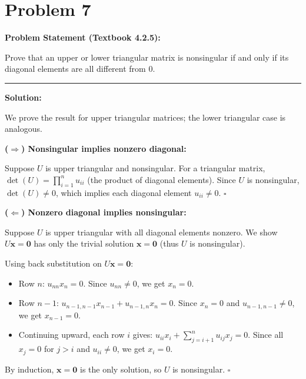 \clearpage
\section*{Problem 7}

\textbf{Problem Statement (Textbook 4.2.5):} 

Prove that an upper or lower triangular matrix is nonsingular if and only if its diagonal elements are all different from $0$.

\noindent\rule{\textwidth}{0.4pt}

\vspace{1em}

\textbf{Solution:}

We prove the result for upper triangular matrices; the lower triangular case is analogous.

\textbf{($\Rightarrow$) Nonsingular implies nonzero diagonal:}

Suppose $U$ is upper triangular and nonsingular. For a triangular matrix, $\det(U) = \prod_{i=1}^{n} u_{ii}$ (the product of diagonal elements). Since $U$ is nonsingular, $\det(U) \neq 0$, which implies each diagonal element $u_{ii} \neq 0$. $\square$

\vspace{1.5em}

\textbf{($\Leftarrow$) Nonzero diagonal implies nonsingular:}

Suppose $U$ is upper triangular with all diagonal elements nonzero. We show $U\mathbf{x} = \mathbf{0}$ has only the trivial solution $\mathbf{x} = \mathbf{0}$ (thus $U$ is nonsingular).

Using back substitution on $U\mathbf{x} = \mathbf{0}$:
\begin{itemize}
    \item Row $n$: $u_{nn}x_n = 0$. Since $u_{nn} \neq 0$, we get $x_n = 0$.
    \item Row $n-1$: $u_{n-1,n-1}x_{n-1} + u_{n-1,n}x_n = 0$. Since $x_n = 0$ and $u_{n-1,n-1} \neq 0$, we get $x_{n-1} = 0$.
    \item Continuing upward, each row $i$ gives: $u_{ii}x_i + \sum_{j=i+1}^{n} u_{ij}x_j = 0$. Since all $x_j = 0$ for $j > i$ and $u_{ii} \neq 0$, we get $x_i = 0$.
\end{itemize}

By induction, $\mathbf{x} = \mathbf{0}$ is the only solution, so $U$ is nonsingular. $\square$

\vspace{1em}

